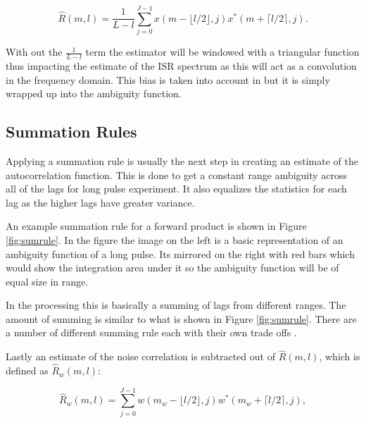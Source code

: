 \documentclass[draft,ras]{agutex}
\begin{document}
\begin{article}
\begin{equation}
\label{eq:lagproub}
\hat{R}(m,l) = \frac{1}{L-l}\displaystyle\sum\limits_{j=0}^{J-1} x(m-\lfloor l/2\rfloor,j)x^*(m+\lceil l/2 \rceil,j).
\end{equation}

\noindent With out the $\frac{1}{L-l}$ term the estimator will be windowed with a triangular function thus impacting the estimate of the ISR spectrum as this will act as a convolution in the frequency domain. This bias is taken into account in \citep{farley1969} but it is simply wrapped up into the ambiguity function. 

\subsection{Summation Rules}
Applying a summation rule is usually the next step in creating an estimate of the autocorrelation function.  This is done to get a constant range ambiguity across all of the lags for long pulse experiment\citep{nygren1996}. It also equalizes the statistics for each lag as the higher lags have greater variance. 

An example summation rule for a forward product is shown in Figure \ref{fig:sumrule}. In the figure the image on the left is a basic representation of an ambiguity function of a long pulse.  Its mirrored on the right with red bars which would show the integration area under it so the ambiguity function will be of equal size in range.  

In the processing this is basically a summing of lags from different ranges.  The amount of summing is similar to what is shown in Figure \ref{fig:sumrule}.  There are a number of different summing rule each with their own trade offs \citep{nygren1996}.  

Lastly an estimate of the noise correlation is subtracted out of $\hat{R}(m,l)$, which is defined as $\hat{R}_w(m,l)$:

\begin{equation}
\label{lagpro}
\hat{R}_w(m,l) = \displaystyle\sum\limits_{j=0}^{J-1} w(m_w-\lfloor l/2\rfloor,j)w^*(m_w+\lceil l/2 \rceil,j),
\end{equation}


\end{article}
\end{document}
